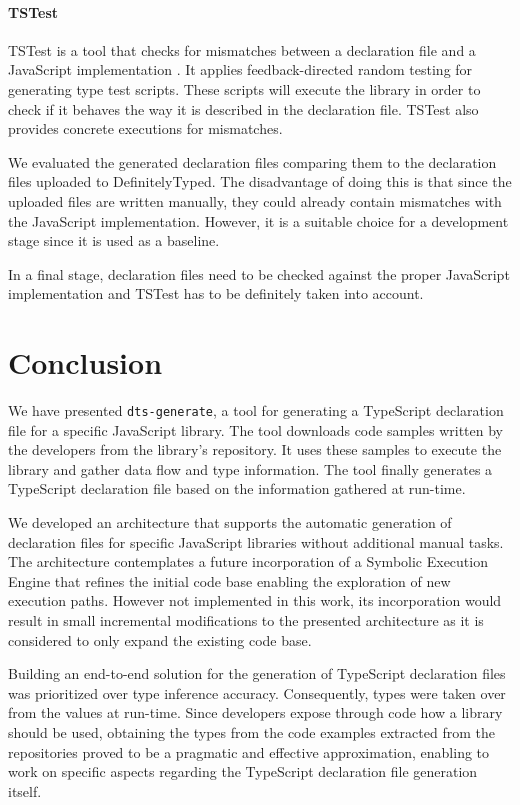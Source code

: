 \documentclass[a4paper,english,cleveref, autoref]{lipics-v2019}
\begin{document}
\paragraph*{TSTest}
TSTest is a tool that checks for mismatches between a declaration file and a JavaScript implementation \cite{DBLP:journals/pacmpl/KristensenM17}. It applies feedback-directed random testing for generating type test scripts. These scripts will execute the library in order to check if it behaves the way it is described in the declaration file. TSTest also provides concrete executions for mismatches.

We evaluated the generated declaration files comparing them to the declaration files uploaded to DefinitelyTyped. The disadvantage of doing this is that since the uploaded files are written manually, they could already contain mismatches with the JavaScript implementation. However, it is a suitable choice for a development stage since it is used as a baseline.

In a final stage, declaration files need to be checked against the proper JavaScript implementation and TSTest has to be definitely taken into account.

\section{Conclusion}
\label{sec:conclusion}
We have presented \texttt{dts-generate}, a tool for generating a TypeScript declaration file for a specific JavaScript library. The tool downloads code samples written by the developers from the library's repository. It uses these samples to execute the library and gather data flow and type information. The tool finally generates a TypeScript declaration file based on the information gathered at run-time.

We developed an architecture that supports the automatic generation of declaration files for specific JavaScript libraries without additional manual tasks. The architecture contemplates a future incorporation of a Symbolic Execution Engine that refines the initial code base enabling the exploration of new execution paths. However not implemented in this work, its incorporation would result in small incremental modifications to the presented architecture as it is considered to only expand the existing code base.

Building an end-to-end solution for the generation of TypeScript declaration files was prioritized over type inference accuracy. Consequently, types were taken over from the values at run-time. Since developers expose through code how a library should be used, obtaining the types from the code examples extracted from the repositories proved to be a pragmatic and effective approximation, enabling to work on specific aspects regarding the TypeScript declaration file generation itself.
\end{document}
